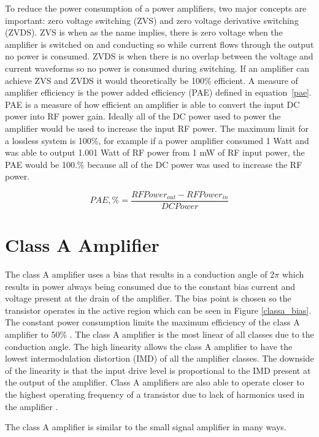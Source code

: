To reduce the power consumption of a power amplifiers, two major concepts are important: zero voltage switching (ZVS) and zero voltage derivative switching (ZVDS). ZVS is when as the name implies, there is zero voltage when the amplifier is switched on and conducting so while current flows through the output no power is consumed. ZVDS is when there is no overlap between the voltage and current waveforms so no power is consumed during switching. If an amplifier can achieve ZVS and ZVDS it would theoretically be 100\% efficient. A measure of amplifier efficiency is the power added efficiency (PAE) defined in equation~\ref{pae}. PAE is a measure of how efficient an amplifier is able to convert the input DC power into RF power gain. Ideally all of the DC power used to power the amplifier would be used to increase the input RF power. The maximum limit for a lossless system is 100\%, for example if a power amplifier consumed 1 Watt and was able to output 1.001 Watt of RF power from 1 mW of RF input power, the PAE would be 100.\% because all of the DC power was used to increase the RF power.

\begin{equation}\label{pae}
  PAE,\% = \frac{RF Power_{out} - RF Power_{in}}{DC Power}
\end{equation}

\section{Class A Amplifier}

The class A amplifier uses a bias that results in a conduction angle of 2$\pi$ which results in power always being consumed due to the constant bias current and voltage present at the drain of the amplifier. The bias point is chosen so the transistor operates in the active region which can be seen in Figure \ref{classa_bias}. The constant power consumption limits the maximum efficiency of the class A amplifier to 50\% \cite{C.Cripps2006}. 
The class A amplifier is the most linear of all classes due to the conduction angle. The high linearity allows the class A amplifier to have the lowest intermodulation distortion (IMD) of all the amplifier classes. The downside of the linearity is that the input drive level is proportional to the IMD present at the output of the amplifier. Class A amplifiers are also able to operate closer to the highest operating frequency of a transistor due to lack of harmonics used in the amplifier \cite{}. %

The class A amplifier is similar to the small signal amplifier in many ways.

